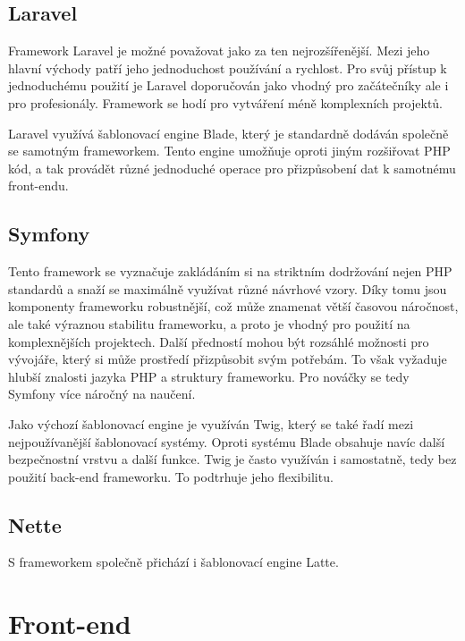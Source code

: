 \documentclass[czech,BP]{thesiskiv}
\begin{document}
\subsection{Laravel}
	\par Framework Laravel je možné považovat jako za ten nejrozšířenější. Mezi jeho hlavní východy patří jeho jednoduchost používání a rychlost. Pro svůj přístup k jednoduchému použití je Laravel doporučován jako vhodný pro začátečníky ale i pro profesionály. Framework se hodí pro vytváření méně komplexních projektů.
	\par Laravel využívá šablonovací engine Blade, který je standardně dodáván společně se samotným frameworkem. Tento engine umožňuje oproti jiným rozšiřovat PHP kód, a tak provádět různé jednoduché operace pro přizpůsobení dat k samotnému front-endu.
\subsection{Symfony}
	\par Tento framework se vyznačuje zakládáním si na striktním dodržování nejen PHP standardů a snaží se maximálně využívat různé návrhové vzory. Díky tomu jsou komponenty frameworku robustnější, což může znamenat větší časovou náročnost, ale také výraznou stabilitu frameworku, a proto je vhodný pro použití na komplexnějších projektech. Další předností mohou být rozsáhlé možnosti pro vývojáře, který si může prostředí přizpůsobit svým potřebám. To však vyžaduje hlubší znalosti jazyka PHP a struktury frameworku. Pro nováčky se tedy Symfony více náročný na naučení.
	\par Jako výchozí šablonovací engine je využíván Twig, který se také řadí mezi nejpoužívanější šablonovací systémy. Oproti systému Blade obsahuje navíc další bezpečnostní vrstvu a další funkce. Twig je často využíván i samostatně, tedy bez použití back-end frameworku. To podtrhuje jeho flexibilitu.
\subsection{Nette}
	\par 
	\par S frameworkem společně přichází i šablonovací engine Latte.
\section{Front-end}
\end{document}
